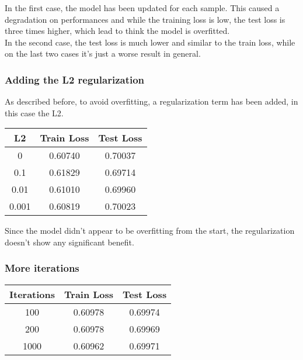 \documentclass[
	letterpaper, %
	10pt, %
]{class}
\begin{document}
In the first case, the model has been updated for each sample. This caused a degradation on performances and while the training loss is low, the test loss is three times higher, which lead to think the model is overfitted.\\

In the second case, the test loss is much lower and similar to the train loss, while on the last two cases it's just a worse result in general.

\subsubsection{Adding the L2 regularization}

As described before, to avoid overfitting, a regularization term has been added, in this case the L2.

\begin{center}
	\begin{tabular}{ |c|c|c| }
		\hline
		L2    & Train Loss & Test Loss \\
		\hline
		0     & 0.60740    & 0.70037   \\
		0.1   & 0.61829    & 0.69714   \\
		0.01  & 0.61010    & 0.69960   \\
		0.001 & 0.60819    & 0.70023   \\
		\hline
	\end{tabular}
\end{center}

Since the model didn't appear to be overfitting from the start, the regularization doesn't show any significant benefit.

\subsubsection{More iterations}

\begin{center}
	\begin{tabular}{ |c|c|c| }
		\hline
		Iterations & Train Loss & Test Loss \\
		\hline
		100        & 0.60978    & 0.69974   \\
		200        & 0.60978    & 0.69969   \\
		1000       & 0.60962    & 0.69971   \\
		\hline
	\end{tabular}
\end{center}
\end{document}
